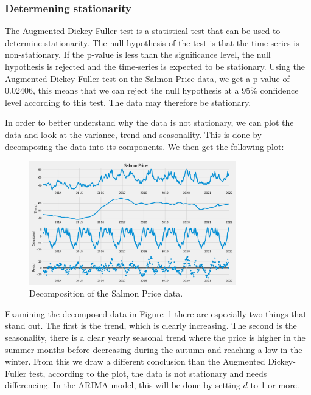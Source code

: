 \subsubsection{Determening stationarity}\label{DeterminingStationarity}
The Augmented Dickey-Fuller test is a statistical test that can be used to determine stationarity. The null hypothesis of the test is that the time-series is non-stationary. If the p-value is less than the significance level, the null hypothesis is rejected and the time-series is expected to be stationary.
Using the Augmented Dickey-Fuller test on the Salmon Price data, we get a p-value of 0.02406, this means that we can reject the null hypothesis at a 95\% confidence level according to this test. The data may therefore be stationary.~\parencite{Dickey_Fuller1979}

In order to better understand why the data is not stationary, we can plot the data and look at the variance, trend and seasonality. This is done by decomposing the data into its components. We then get the following plot: 

\begin{figure}[H]
    \centering
    \includegraphics[width=0.8\textwidth]{data/Figures/ARIMA/Decomposition.png}
    \caption[Decomposition of the Salmon Price data]{Decomposition of the Salmon Price data.}\label{fig:Decomposition}
\end{figure}
Examining the decomposed data in Figure~\ref{fig:Decomposition} there are especially two things that stand out. The first is the trend, which is clearly increasing. The second is the seasonality, there is a clear yearly seasonal trend where the price is higher in the summer months before decreasing during the autumn and reaching a low in the winter. From this we draw a different conclusion than the Augmented Dickey-Fuller test, according to the plot, the data is not stationary and needs differencing. In the ARIMA model, this will be done by setting $d$ to 1 or more. 

